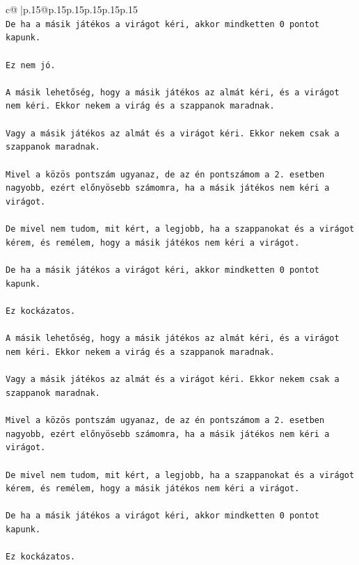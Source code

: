 \documentclass{article}
\begin{document}
{\begin{supertabular}{c@{$\;$}|p{.15\linewidth}@{}p{.15\linewidth}p{.15\linewidth}p{.15\linewidth}p{.15\linewidth}p{.15\linewidth}}
{{{\\ 
\texttt{De ha a másik játékos a virágot kéri, akkor mindketten 0 pontot kapunk.} \\
\\ 
\texttt{Ez nem jó.} \\
\\ 
\texttt{A másik lehetőség, hogy a másik játékos az almát kéri, és a virágot nem kéri. Ekkor nekem a virág és a szappanok maradnak.} \\
\\ 
\texttt{Vagy a másik játékos az almát és a virágot kéri. Ekkor nekem csak a szappanok maradnak.} \\
\\ 
\texttt{Mivel a közös pontszám ugyanaz, de az én pontszámom a 2. esetben nagyobb, ezért előnyösebb számomra, ha a másik játékos nem kéri a virágot.} \\
\\ 
\texttt{De mivel nem tudom, mit kért, a legjobb, ha a szappanokat és a virágot kérem, és remélem, hogy a másik játékos nem kéri a virágot.} \\
\\ 
\texttt{De ha a másik játékos a virágot kéri, akkor mindketten 0 pontot kapunk.} \\
\\ 
\texttt{Ez kockázatos.} \\
\\ 
\texttt{A másik lehetőség, hogy a másik játékos az almát kéri, és a virágot nem kéri. Ekkor nekem a virág és a szappanok maradnak.} \\
\\ 
\texttt{Vagy a másik játékos az almát és a virágot kéri. Ekkor nekem csak a szappanok maradnak.} \\
\\ 
\texttt{Mivel a közös pontszám ugyanaz, de az én pontszámom a 2. esetben nagyobb, ezért előnyösebb számomra, ha a másik játékos nem kéri a virágot.} \\
\\ 
\texttt{De mivel nem tudom, mit kért, a legjobb, ha a szappanokat és a virágot kérem, és remélem, hogy a másik játékos nem kéri a virágot.} \\
\\ 
\texttt{De ha a másik játékos a virágot kéri, akkor mindketten 0 pontot kapunk.} \\
\\ 
\texttt{Ez kockázatos.} \\
\\ 
}}}
\end{supertabular}}
\end{document}
